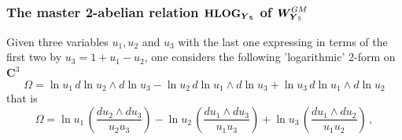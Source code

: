 \documentclass[11pt]{amsart}
\begin{document}
\subsubsection{\bf The master 2-abelian relation $\boldsymbol{{\bf HLOG}_{ \boldsymbol{Y}_5}}$ of $\boldsymbol{W}^{GM}_{\hspace{-0.05cm}\boldsymbol{Y}_5}$}
\label{SSS:The-master-2-AR}
Given three variables $u_1,u_2$ and $u_3$ with the last one expressing 
in terms of the first two 
by $u_3=1+u_1-u_2$, one considers the following 'logarithmic' 2-form on $\mathbf C^3$
\begin{equation}
\label{Eq:Omega-0}
\Omega=\ln  u_{1}\,
d \ln  u_{2}\wedge 
d \ln  u_{3}
-
\ln  u_{2}\,
d \ln  u_{1}\wedge 
d \ln  u_{3}
%
+\ln  u_{3}\, 
d \ln  u_{1}\wedge 
d \ln  u_{2}
\end{equation}
that is
\begin{equation}
\label{Eq:Omega-u1u2u3}
\Omega=
\ln  u_{1}\, \left( 
\frac{ \mathit{du_2} \wedge  \mathit{du_3}
}{\mathit{u_2} \mathit{u_3}}
\right) 
-\ln    u_{2}\,   \left( 
\frac{ \mathit{du_1} \wedge  \mathit{du_3}
}{\mathit{u_1} \mathit{u_3}}
\right) 
+
\ln    u_{3}\, \left( 
\frac{ \mathit{du_1} \wedge  \mathit{du_2}
}{\mathit{u_1} \mathit{u_2}}
\right) \, , 
\end{equation}
%
\end{document}
